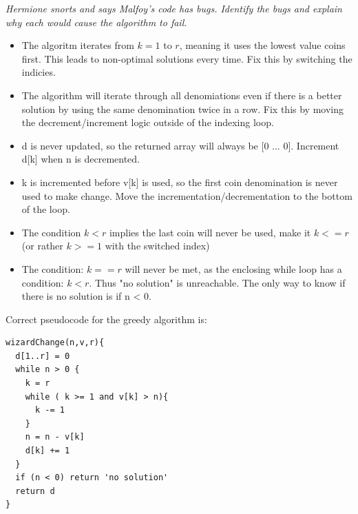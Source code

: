 \documentclass[12pt]{article} \setlength{\oddsidemargin}{0in}
\begin{document}
{\begin{enumerate}
\textit{Hermione snorts and says Malfoy's code has bugs. Identify the bugs and explain
why each would cause the algorithm to fail.}
    \begin{itemize}
      \item The algoritm iterates from $k=1$ to $r$, meaning it uses the lowest value coins first. This leads to non-optimal solutions every time. Fix this by switching the indicies. 
      \item The algorithm will iterate through all denomiations even if there is a better solution by using the same denomination twice in a row. Fix this by moving the decrement/increment logic outside of the indexing loop.
      \item d is never updated, so the returned array will always be [0 ... 0]. Increment d[k] when n is decremented.
      \item k is incremented before v[k] is used, so the first coin denomination is never used to make change. Move the incrementation/decrementation to the bottom of the loop.
      \item The condition $k<r$ implies the last coin will never be used, make it $k<=r$ (or rather $k >= 1$ with the switched index)
      \item The condition: $k==r$ will never be met, as the enclosing while loop has a condition: $k<r$. Thus "no solution" is unreachable. The only way to know if there is no solution is if n < 0. 
  \end{itemize}

\pagebreak

Correct pseudocode for the greedy algorithm is:\\
\begin{verbatim}
wizardChange(n,v,r){
  d[1..r] = 0
  while n > 0 { 
    k = r
    while ( k >= 1 and v[k] > n){ 
      k -= 1
    }
    n = n - v[k]
    d[k] += 1
  }
  if (n < 0) return 'no solution'
  return d
}
\end{verbatim}

\pagebreak


\end{enumerate}}
\end{document}
